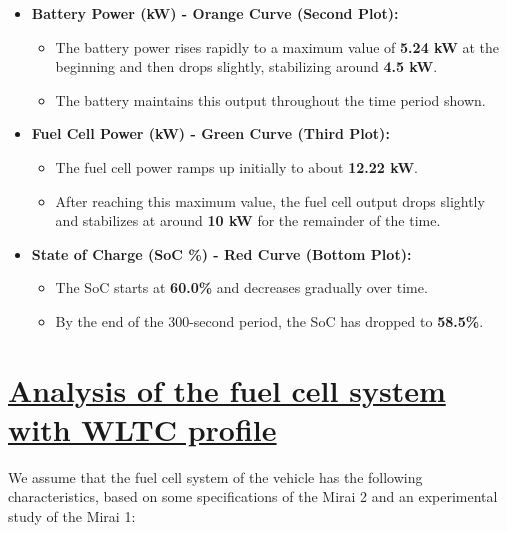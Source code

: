 \documentclass[12pt,a4paper]{article}
\numberwithin{equation}{section}
\begin{document}
{\begin{itemize}
	\item \textbf{Battery Power (kW) - Orange Curve (Second Plot):}
	\begin{itemize}
		\item The battery power rises rapidly to a maximum value of \textbf{5.24 kW} at the beginning and then drops slightly, stabilizing around \textbf{4.5 kW}.
		\item The battery maintains this output throughout the time period shown.
	\end{itemize}
	
	\item \textbf{Fuel Cell Power (kW) - Green Curve (Third Plot):}
	\begin{itemize}
		\item The fuel cell power ramps up initially to about \textbf{12.22 kW}.
		\item After reaching this maximum value, the fuel cell output drops slightly and stabilizes at around \textbf{10 kW} for the remainder of the time.
	\end{itemize}
	
	\item \textbf{State of Charge (SoC \%) - Red Curve (Bottom Plot):}
	\begin{itemize}
		\item The SoC starts at \textbf{60.0\%} and decreases gradually over time.
		\item By the end of the 300-second period, the SoC has dropped to \textbf{58.5\%}.
	\end{itemize}
\end{itemize}






\section{\underline{Analysis of the fuel cell system with WLTC profile}}

We assume that the fuel cell system of the vehicle has the following characteristics, based on some specifications of the Mirai 2 and an experimental study of the Mirai 1:

}
\end{document}
